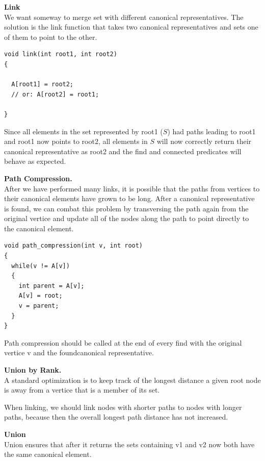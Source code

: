 \documentclass[11pt]{article}
\begin{document}
\textbf{Link}\\

We want someway to merge set with different canonical representatives. The solution is the link function that takes two canonical representatives and sets one of them to point to the other.

\begin{verbatim}
void link(int root1, int root2)
{

  A[root1] = root2;
  // or: A[root2] = root1;

}
\end{verbatim}

Since all elements in the set represented by root1 ($S$) had paths leading to root1 and root1 now points to root2, all elements in $S$ will now correctly return their canonical representative as root2 and the find and connected predicates will behave as expected.

\newpage

\textbf{Path Compression.}\\

After we have performed many links, it is possible that the paths from vertices to their canonical elements have grown to be long. After a canonical representative is found, we can combat this problem by transversing the path again from the original vertice and update all of the nodes along the path to point directly to the canonical element.

\begin{verbatim}
void path_compression(int v, int root)
{
  while(v != A[v])
  {
    int parent = A[v];
    A[v] = root;
    v = parent;
  }
}
\end{verbatim}

Path compression should be called at the end of every find with the original vertice v and the foundcanonical representative.


\textbf{Union by Rank.}\\

A standard optimization is to keep track of the longest distance a given root node is away from a vertice that is a member of its set.

When linking, we should link nodes with shorter paths to nodes with longer paths, because then the overall longest path distance has not increased.

\textbf{Union}\\

Union ensures that after it returns the sets containing v1 and v2 now both have the same canonical element.
\end{document}
